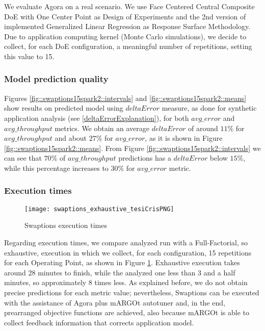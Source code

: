 We evaluate Agora on a real scenario. We use Face Centered Central Composite DoE with One Center Point as Design of Experiments and the 2nd version of implemented Generalized Linear Regression as Response Surface Methodology. Due to application computing kernel (Monte Carlo simulations), we decide to collect, for each DoE configuration, a meaningful number of repetitions, setting this value to 15.


\subsubsection{Model prediction quality}

Figures \ref{fig::swaptions15spark2::intervals} and \ref{fig::swaptions15spark2::means} show results on predicted model using $deltaError$ measure, as done for synthetic application analysis (see \ref{deltaErrorExplanation}), for both $avg\_error$ and $avg\_throughput$ metrics. We obtain an average $deltaError$ of around $11\%$ for $avg\_throughput$ and about $27\%$ for $avg\_error$, as it is shown in Figure \ref{fig::swaptions15spark2::means}. From Figure \ref{fig::swaptions15spark2::intervals} we can see that $70\%$ of $avg\_throughput$ predictions has a $deltaError$ below $15\%$, while this percentage increases to $30\%$ for $avg\_error$ metric.


\subsubsection{Execution times}

\begin{figure}[htb]

    \centering
    
    \texttt{[image: swaptions\_exhaustive\_tesiCrisPNG]}
    
    \caption{Swaptions execution times}
    
    \label{fig::sw::execT}
    
\end{figure}

Regarding execution times, we compare analyzed run with a Full-Factorial, so exhaustive, execution in which we collect, for each configuration, 15 repetitions for each Operating Point, as shown in Figure \ref{fig::sw::execT}. Exhaustive execution takes around 28 minutes to finish, while the analyzed one less than 3 and a half minutes, so approximately 8 times less. As explained before, we do not obtain precise predictions for each metric value; nevertheless, Swaptions can be executed with the assistance of Agora plus mARGOt autotuner and, in the end, prearranged objective functions are achieved, also because mARGOt is able to collect feedback information that corrects application model.


